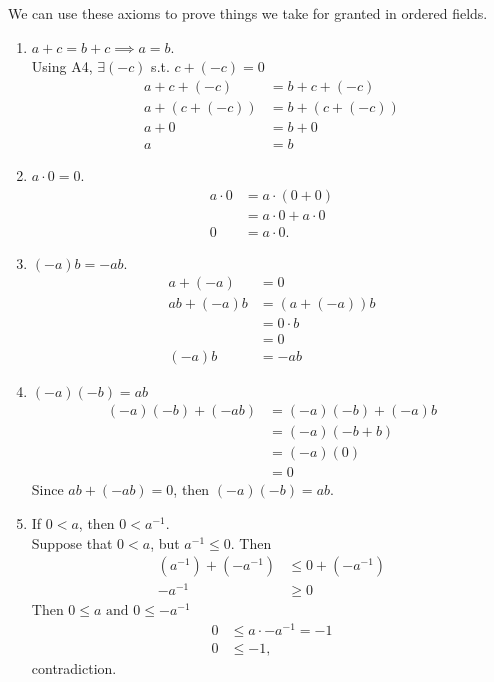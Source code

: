 \documentclass[11pt]{scrartcl}
\numberwithin{equation}{section}
\begin{document}
\begin{example}
    We can use these axioms to prove things we take for granted 
    in ordered fields.
    \begin{enumerate}
        \item $a+c = b+c \implies a=b$. \\
        Using A4, $\exists(-c)$ s.t. $c+(-c)=0$ 
        \begin{align*}
            a + c + (-c) &= b + c + (-c)  \\
            a + (c+(-c)) &= b + (c +(-c)) \\
            a + 0 &= b+ 0 \\
            a &= b
        \end{align*}
        \item $a\cdot0=0$.
        \begin{align*}
            a \cdot 0 &= a\cdot(0 + 0) \tag{A3}\\
            &= a\cdot0 + a\cdot0 \tag{DL}\\
            0 &= a\cdot 0.
        \end{align*}
        \item $(-a)b=-ab$.
        \begin{align*}
            a+(-a) &= 0\\
            ab + (-a)b &= (a+(-a))b \tag{DL} \\
            &= 0 \cdot b \\
            &= 0 \\
            (-a)b &=-ab
        \end{align*}
        \item $(-a)(-b) = ab$ 
        \begin{align*}
            (-a)(-b) + (-ab) &= (-a)(-b)+(-a)b \\
            &= (-a)(-b+b) \tag{DL} \\
            &= (-a)(0) \\
            &= 0 
        \end{align*}
        Since $ab + (-ab)=0$, then $(-a)(-b) = ab$. 
        \item If $0<a$, then $0<a^{-1}$.\\
        Suppose that $0<a$, but $a^{-1}\leq 0$. Then
        \begin{align*}
            (a^{-1})+(-a^{-1}) &\leq 0 + (-a^{-1}) \tag{O4} \\
            -a^{-1}&\geq 0
        \end{align*}
        Then $0 \leq a \text{ and } 0 \leq -a^{-1}$
        \begin{align*}
            0&\leq a\cdot-a^{-1} = -1\\
            0&\leq -1,
        \end{align*}
        contradiction.
    \end{enumerate}
\end{example}
\end{document}
